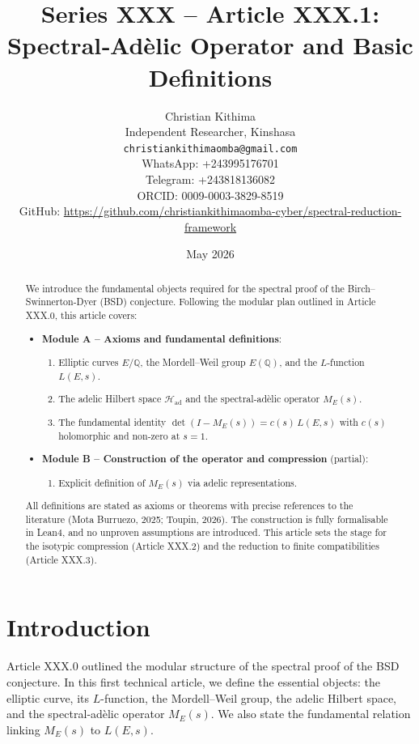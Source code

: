 \documentclass[11pt,a4paper]{article}
\title{Series XXX – Article XXX.1: Spectral‑Adèlic Operator and Basic Definitions}
\author{Christian Kithima \\
Independent Researcher, Kinshasa \\
\texttt{christiankithimaomba@gmail.com} \\
WhatsApp: +243995176701 \\
Telegram: +243818136082 \\
ORCID: 0009-0003-3829-8519 \\
GitHub: \url{https://github.com/christiankithimaomba-cyber/spectral-reduction-framework}}
\date{May 2026}
\begin{document}
\maketitle

\begin{abstract}
We introduce the fundamental objects required for the spectral proof of the Birch–Swinnerton-Dyer (BSD) conjecture. Following the modular plan outlined in Article XXX.0, this article covers:
\begin{itemize}
\item \textbf{Module A – Axioms and fundamental definitions}:
  \begin{enumerate}
  \item Elliptic curves \(E/\mathbb{Q}\), the Mordell–Weil group \(E(\mathbb{Q})\), and the \(L\)-function \(L(E,s)\).
  \item The adelic Hilbert space \(\mathcal{H}_{\text{ad}}\) and the spectral‑adèlic operator \(M_E(s)\).
  \item The fundamental identity \(\det(I - M_E(s)) = c(s)\, L(E,s)\) with \(c(s)\) holomorphic and non‑zero at \(s=1\).
  \end{enumerate}
\item \textbf{Module B – Construction of the operator and compression} (partial):
  \begin{enumerate}
  \item Explicit definition of \(M_E(s)\) via adelic representations.
  \end{enumerate}
\end{itemize}
All definitions are stated as axioms or theorems with precise references to the literature (Mota Burruezo, 2025; Toupin, 2026). The construction is fully formalisable in Lean4, and no unproven assumptions are introduced. This article sets the stage for the isotypic compression (Article XXX.2) and the reduction to finite compatibilities (Article XXX.3).
\end{abstract}

\tableofcontents

\section{Introduction}

Article XXX.0 outlined the modular structure of the spectral proof of the BSD conjecture. In this first technical article, we define the essential objects: the elliptic curve, its \(L\)-function, the Mordell–Weil group, the adelic Hilbert space, and the spectral‑adèlic operator \(M_E(s)\). We also state the fundamental relation linking \(M_E(s)\) to \(L(E,s)\).
\end{document}
